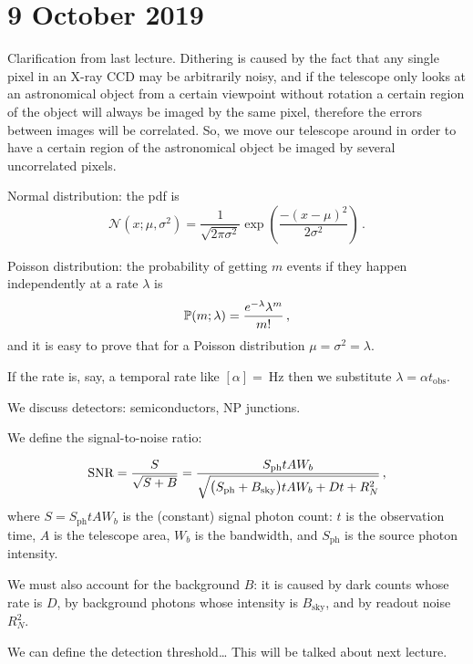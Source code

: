 \documentclass[main.tex]{subfiles}
\begin{document}
\section*{9 October 2019}

Clarification from last lecture.
Dithering is caused by the fact that any single pixel in an X-ray CCD may be arbitrarily noisy, and if the telescope only looks at an astronomical object from a certain viewpoint without rotation a certain region of the object will always be imaged by the same pixel, therefore the errors between images will be correlated.
So, we move our telescope around in order to have a certain region of the astronomical object be imaged by several uncorrelated pixels.

Normal distribution: the pdf is
%
\begin{equation}
  \mathcal N (x; \mu, \sigma^2) = \frac{1}{\sqrt{2 \pi \sigma^2}} \exp(\frac{-(x-\mu)^2}{2\sigma^2} ) \,.
\end{equation}

Poisson distribution: the probability of getting \(m\) events if they happen independently at a rate \(\lambda\) is
%
\begin{equation}
\P (m ; \lambda) = \frac{e^{-\lambda} \lambda^m}{m!} \,,
\end{equation}
%
and it is easy to prove that for a Poisson distribution \(\mu = \sigma^2 = \lambda\).

If the rate is, say, a temporal rate like \([\alpha] = \SI{}{\hertz}\) then we substitute \(\lambda = \alpha t_{\text{obs}}\).

We discuss detectors: semiconductors, NP junctions.

We define the signal-to-noise ratio:

\begin{equation}
	\text{SNR} = \frac{S}{\sqrt{S + B}}
	= \frac{S_{\text{ph}} t A W_b}{\sqrt{\qty(S_{\text{ph}} + B_\text{sky})tAW_b + Dt + R^2_N } }\,,
\end{equation}
%
where $S= S_{\text{ph}} tAW_b$ is the (constant) signal photon count: \(t\) is the observation time, \(A\) is the telescope area, \(W_b\) is the bandwidth, and \(S_{\text{ph}}\) is the source photon intensity.

We must also account for the background $B$: it is caused by dark counts whose rate is \(D\), by background photons whose intensity is \(B_{\text{sky}}\), and by readout noise \(R_N^2\).

We can define the detection threshold\dots
This will be talked about next lecture.
\end{document}
